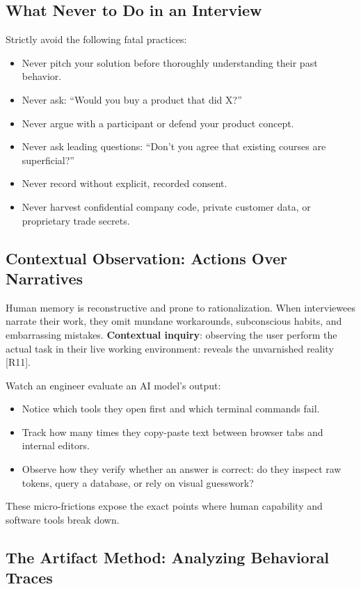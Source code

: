 \subsection{What Never to Do in an Interview}

Strictly avoid the following fatal practices:
\begin{itemize}[leftmargin=1.2em,itemsep=0.2ex]
  \item Never pitch your solution before thoroughly understanding their past behavior.
  \item Never ask: ``Would you buy a product that did X?''
  \item Never argue with a participant or defend your product concept.
  \item Never ask leading questions: ``Don't you agree that existing courses are superficial?''
  \item Never record without explicit, recorded consent.
  \item Never harvest confidential company code, private customer data, or proprietary trade secrets.
\end{itemize}

\subsection{Contextual Observation: Actions Over Narratives}

Human memory is reconstructive and prone to rationalization. When interviewees narrate their work, they omit mundane workarounds, subconscious habits, and embarrassing mistakes. \textbf{Contextual inquiry}: observing the user perform the actual task in their live working environment: reveals the unvarnished reality [R11].

Watch an engineer evaluate an AI model's output:
\begin{itemize}[leftmargin=1.2em,itemsep=0.2ex]
  \item Notice which tools they open first and which terminal commands fail.
  \item Track how many times they copy-paste text between browser tabs and internal editors.
  \item Observe how they verify whether an answer is correct: do they inspect raw tokens, query a database, or rely on visual guesswork?
\end{itemize}
These micro-frictions expose the exact points where human capability and software tools break down.

\subsection{The Artifact Method: Analyzing Behavioral Traces}

